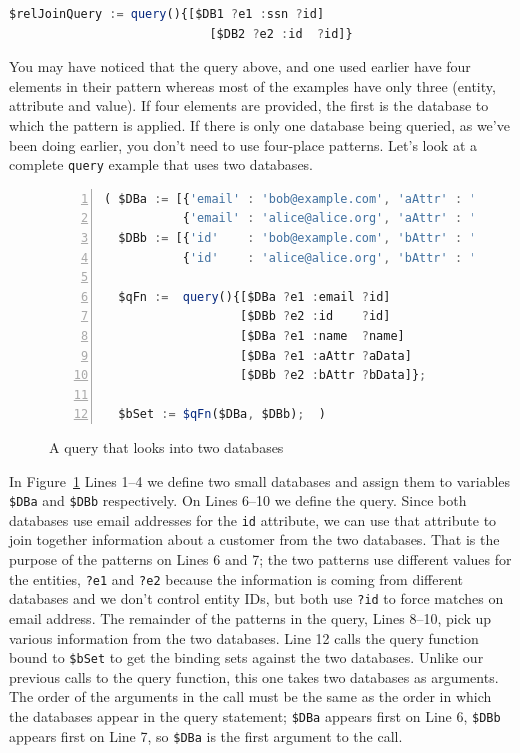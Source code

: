 \documentclass[9pt,letterpaper]{article}
\newcommand{\stt}[1]{\texttt{#1}} %
\begin{document}
\begin{lstlisting}[language=JavaScript,numbers=none,basicstyle=\ttfamily\scriptsize]
   $relJoinQuery := query(){[$DB1 ?e1 :ssn ?id]
                            [$DB2 ?e2 :id  ?id]}
\end{lstlisting} \vspace{-2em}

You may have noticed that the query above, and one used earlier have four elements in their pattern whereas most of the examples have only three (entity, attribute and value).
If four elements are provided, the first is the database to which the pattern is applied.
If there is only one database being queried, as we've been doing earlier, you don't need to use four-place patterns.
Let's look at a complete \stt{query} example that uses two databases.

\begin{figure}[H]
    \caption{A query that looks into two databases}
    \label{code:two-database-query}
\begin{lstlisting}[language=JavaScript,numberstyle=\scriptsize,basicstyle=\ttfamily\scriptsize,numbers=left,stepnumber=1,breaklines=true]
( $DBa := [{'email' : 'bob@example.com', 'aAttr' : 'Bob-A-data',   'name' : 'Bob'},
           {'email' : 'alice@alice.org', 'aAttr' : 'Alice-A-data', 'name' : 'Alice'}];
  $DBb := [{'id'    : 'bob@example.com', 'bAttr' : 'Bob-B-data'},
           {'id'    : 'alice@alice.org', 'bAttr' : 'Alice-B-data'}];

  $qFn :=  query(){[$DBa ?e1 :email ?id]
                   [$DBb ?e2 :id    ?id]
                   [$DBa ?e1 :name  ?name]
                   [$DBa ?e1 :aAttr ?aData]
                   [$DBb ?e2 :bAttr ?bData]};

  $bSet := $qFn($DBa, $DBb);  )
\end{lstlisting}
  \end{figure} \vspace{-2em}

  In Figure~\ref{code:two-database-query} Lines 1--4 we define two small databases and assign them to variables \stt{\$DBa} and \stt{\$DBb} respectively. On Lines 6--10 we define the query.
Since both databases use email addresses for the \stt{id} attribute, we can use that attribute to join together information about a customer from the two databases.
That is the purpose of the patterns on Lines 6 and 7; the two patterns use different values for the entities, \stt{?e1} and \stt{?e2}
because the information is coming from different databases and we don't control entity IDs, but both use \stt{?id} to force
matches on email address.
The remainder of the patterns in the query, Lines 8--10, pick up various information from the two databases.
Line 12 calls the query function bound to \stt{\$bSet} to get the binding sets against the two databases.
Unlike our previous calls to the query function, this one takes two databases as arguments.
The order of the arguments in the call must be the same as the order in which the databases appear in the query statement;
\stt{\$DBa} appears first on Line 6, \stt{\$DBb} appears first on Line 7, so \stt{\$DBa} is the first argument to the call.
\end{document}
